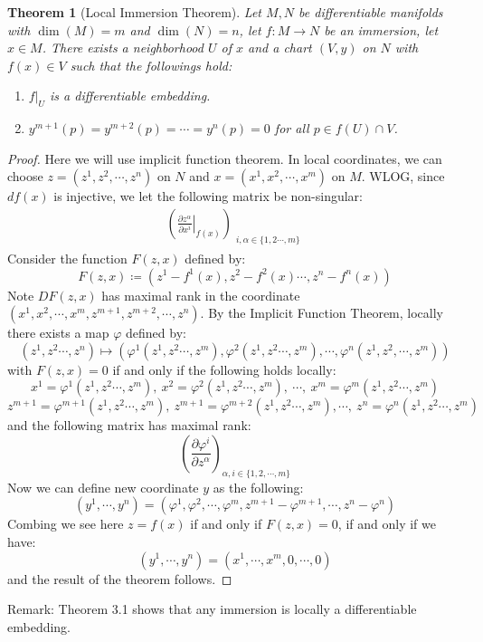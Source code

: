 \documentclass[11pt]{book}
\theoremstyle{break}
\theoremstyle{break}
\newtheorem{thm}{Theorem}[section]
\newcommand{\pd}{\partial}
\newcommand{\remark}{\color{blue}Remark: \color{black}}
\begin{document}
\begin{thm}[Local Immersion Theorem]
Let $M,N$ be differentiable manifolds with $\dim(M) = m$ and $\dim(N) = n$, let $f:M \to N$ be an immersion, let $x \in M$. There exists a neighborhood $U$ of $x$ and a chart $(V,y)$ on $N$ with $f(x) \in V$ such that the followings hold:
\begin{enumerate}[topsep=3pt,itemsep=-1ex,partopsep=1ex,parsep=1ex]
\item $f|_U$ is a differentiable embedding.
\item $y^{m+1}(p) =y^{m+2}(p)= \cdots = y^n(p) = 0$ for all $p \in f(U) \cap V$.
\end{enumerate}
\end{thm}
\begin{proof}
Here we will use implicit function theorem. In local coordinates, we can choose $z = (z^1,z^2,\cdots, z^n)$ on $N$ and $x=(x^1, x^2,\cdots, x^m)$ on $M$. WLOG, since $df(x)$ is injective, we let the following matrix be non-singular:
\begin{align*}
\left(\left.\frac{\pd z^\alpha }{\pd x^i} \right|_{f(x)}\right)_{\substack{i,\alpha\in\{ 1,2\cdots, m\}}}
\end{align*}
Consider the function $F(z,x)$ defined by:
$$F(z,x) \coloneqq (z^1 - f^1(x) ,z^2 - f^2(x)  \cdots, z^n-f^n(x))$$
Note $DF(z,x)$ has maximal rank in the coordinate $(x^1, x^2,\cdots, x^m, z^{m+1},z^{m+2}, \cdots , z^n)$. By the Implicit Function Theorem, locally there exists a map $\varphi$ defined by:
$$(z^1,z^2 \cdots, z^n)\mapsto (\varphi^1(z^1,z^2\cdots, z^m),\varphi^2(z^1,z^2\cdots, z^m),\cdots, \varphi^n(z^1,z^2, \cdots, z^m))$$
with $F(z,x) = 0$ if and only if the following holds locally:
$$x^1 = \varphi^1(z^1,z^2 \cdots, z^m),\ x^2 = \varphi^2(z^1,z^2 \cdots, z^m),\ \cdots,\ x^m = \varphi^m(z^1,z^2\cdots, z^m)$$ 
$$z^{m+1} = \varphi^{m+1}(z^1,z^2 \cdots, z^m),\ z^{m+1} = \varphi^{m+2}(z^1,z^2 \cdots, z^m),\cdots,\ z^n = \varphi^n(z^1,z^2\cdots, z^m)$$ 
and the following matrix has maximal rank:
$$\left( \frac{\pd \varphi^i}{\pd z^\alpha}\right)_{\alpha, i \in\{ 1,2,\cdots, m\}}$$ 
Now we can define new coordinate $y$ as the following:
$$(y^1, \cdots, y^n) = (\varphi^1,\varphi^2,\cdots, \varphi^m, z^{m+1}-\varphi^{m+1},\cdots, z^n - \varphi^n)$$
Combing we see here $z = f(x)$ if and only if $F(z,x) = 0$, if and only if we have:
$$(y^1, \cdots, y^n) = (x^1,\cdots, x^m,0,\cdots, 0)$$
and the result of the theorem follows.
\end{proof}
\remark Theorem 3.1 shows that any immersion is locally a differentiable embedding.
\end{document}
